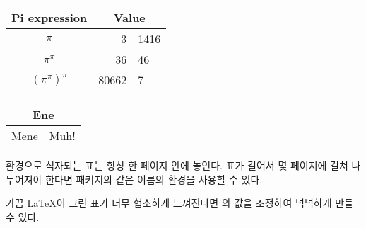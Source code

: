 
\begin{example}
\begin{tabular}{c r @{.} l}
Pi expression       &
\multicolumn{2}{c}{Value} \\
\hline
$\pi$               & 3&1416  \\
$\pi^{\pi}$         & 36&46   \\
$(\pi^{\pi})^{\pi}$ & 80662&7 \\
\end{tabular}
\end{example}

\vspace{-.5\onelineskip}

\begin{example}
\begin{tabular}{|c|c|}
\hline
\multicolumn{2}{|c|}{Ene} \\
\hline
Mene & Muh! \\
\hline
\end{tabular}
\end{example}

 환경으로 식자되는 표는 항상 한 페이지 안에 놓인다. 표가 길어서 몇 페이지에 걸쳐
나누어져야 한다면  패키지의 같은 이름의 환경을 사용할 수 있다.

가끔 \LaTeX 이 그린 표가 너무 협소하게 느껴진다면 와  값을
조정하여 넉넉하게 만들 수 있다.

